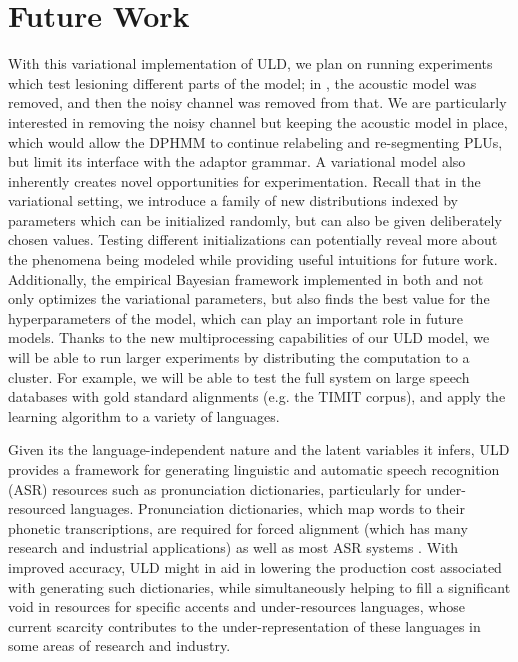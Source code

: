 \documentclass[12pt,letterpaper]{article}
\begin{document}
\section{Future Work}
With this variational implementation of ULD, we plan on running experiments which test lesioning different parts of the model; in \citet{lee:2015}, the acoustic model was removed, and then the noisy channel was removed from that. We are particularly interested in removing the noisy channel but keeping the acoustic model in place, which would allow the DPHMM to continue relabeling and re-segmenting PLUs, but limit its interface with the adaptor grammar. A variational model also inherently creates novel opportunities for experimentation. Recall that in the variational setting, we introduce a family of new distributions indexed by parameters which can be initialized randomly, but can also be given deliberately chosen values. Testing different initializations can potentially reveal more about the phenomena being modeled while providing useful intuitions for future work. Additionally, the empirical Bayesian framework implemented in both \citet{zhai:2014} and \citet{ondel:2016} not only optimizes the variational parameters, but also finds the best value for the hyperparameters of the model, which can play an important role in future models. Thanks to the new multiprocessing capabilities of our ULD model, we will be able to run larger experiments by distributing the computation to a cluster. For example, we will be able to test the full system on large speech databases with gold standard alignments (e.g. the TIMIT corpus), and apply the learning algorithm to a variety of languages. 

Given its the language-independent nature and the latent variables it infers, ULD provides a framework for generating linguistic and automatic speech recognition (ASR) resources such as pronunciation dictionaries, particularly for under-resourced languages. Pronunciation dictionaries, which map words to their phonetic transcriptions, are required for forced alignment (which has many research and industrial applications) as well as most ASR systems \citep{besacier:2014}. With improved accuracy, ULD might in aid in lowering the production cost associated with generating such dictionaries, while simultaneously helping to fill a significant void in resources for specific accents and under-resources languages, whose current scarcity contributes to the under-representation of these languages in some areas of research and industry. 
\end{document}

